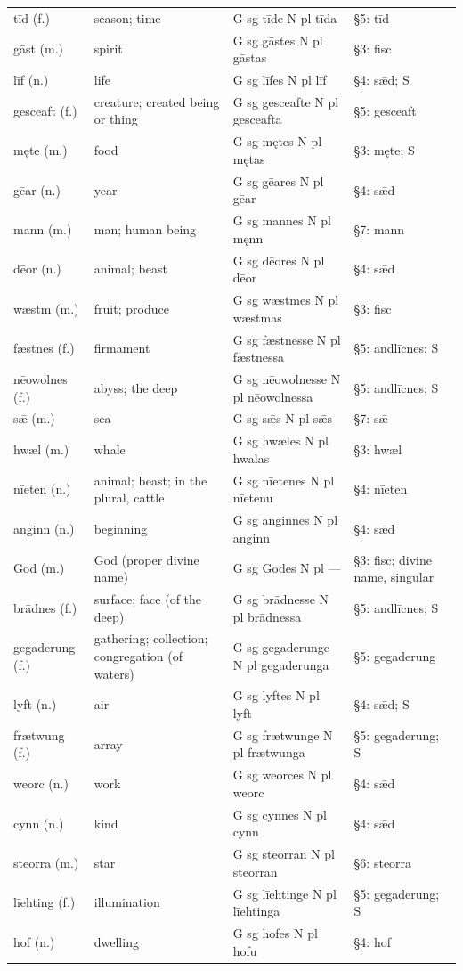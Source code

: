 \begin{longtable}{@{}>{\raggedright\arraybackslash}p{24.0mm}>{\raggedright\arraybackslash}p{39.0mm}>{\raggedright\arraybackslash}p{28.0mm}>{\raggedright\arraybackslash}p{24.564mm}@{}}
 tīd (f.) & season; time & G sg tīde N pl tīda & §5: tīd \\
 gāst (m.) & spirit & G sg gāstes N pl gāstas & §3: fisc \\
 līf (n.) & life & G sg līfes N pl līf & §4: sǣd; S \\
 gesceaft (f.) & creature; created being or thing & G sg gesceafte N pl gesceafta & §5: gesceaft \\
 męte (m.) & food & G sg mętes N pl mętas & §3: męte; S \\
 gēar (n.) & year & G sg gēares N pl gēar & §4: sǣd \\
 mann (m.) & man; human being & G sg mannes N pl męnn & §7: mann \\
 dēor (n.) & animal; beast & G sg dēores N pl dēor & §4: sǣd \\
 wæstm (m.) & fruit; produce & G sg wæstmes N pl wæstmas & §3: fisc \\
 fæstnes (f.) & firmament & G sg fæstnesse N pl fæstnessa & §5: andlīcnes; S \\
 nēowolnes (f.) & abyss; the deep & G sg nēowolnesse N pl nēowolnessa & §5: andlīcnes; S \\
 sǣ (m.) & sea & G sg sǣs N pl sǣs & §7: sǣ \\
 hwæl (m.) & whale & G sg hwæles N pl hwalas & §3: hwæl \\
 nīeten (n.) & animal; beast; in the plural, cattle & G sg nīetenes N pl nīetenu & §4: nīeten \\
 anginn (n.) & beginning & G sg anginnes N pl anginn & §4: sǣd \\
 God (m.) & God (proper divine name) & G sg Godes N pl — & §3: fisc; divine name, singular \\
 brādnes (f.) & surface; face (of the deep) & G sg brādnesse N pl brādnessa & §5: andlīcnes; S \\
 gegaderung (f.) & gathering; collection; congregation (of waters) & G sg gegaderunge N pl gegaderunga & §5: gegaderung \\
 lyft (n.) & air & G sg lyftes N pl lyft & §4: sǣd; S \\
 frætwung (f.) & array & G sg frætwunge N pl frætwunga & §5: gegaderung; S \\
 weorc (n.) & work & G sg weorces N pl weorc & §4: sǣd \\
 cynn (n.) & kind & G sg cynnes N pl cynn & §4: sǣd \\
 steorra (m.) & star & G sg steorran N pl steorran & §6: steorra \\
 līehting (f.) & illumination & G sg līehtinge N pl līehtinga & §5: gegaderung; S \\
 hof (n.) & dwelling & G sg hofes N pl hofu & §4: hof \\
\end{longtable}
\par\endgroup

